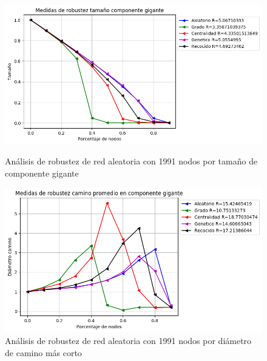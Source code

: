 \begin{figure}[!htb]
    \begin{minipage}{0.48\textwidth}
        \centering
        \includegraphics[scale=0.4]{CapituloAAnexos/imagenesAnexoC/Robustez/grafica_GC20180501_072543Random1991Nodes5939}
        \caption{Análisis de robustez de red aleatoria con 1991 nodos por tamaño de componente gigante}
    \end{minipage}\hfill
   \begin{minipage}{0.48\textwidth}
         \centering
       \includegraphics[scale=0.4]{CapituloAAnexos/imagenesAnexoC/Robustez/grafica_APL20180501_072543Random1991Nodes5939}
        \caption{Análisis de robustez de red aleatoria con 1991 nodos por diámetro de camino más corto}
    \end{minipage}
\end{figure}

